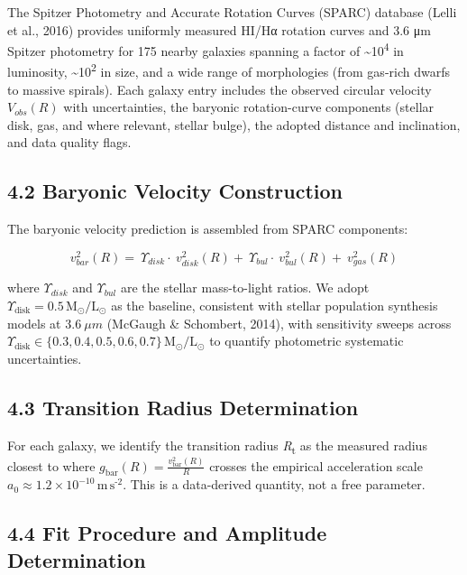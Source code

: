 The Spitzer Photometry and Accurate Rotation Curves (SPARC) database (Lelli et al., 2016) provides uniformly measured HI/Hα rotation curves and 3.6 μm Spitzer photometry for 175 nearby galaxies spanning a factor of \textasciitilde10\textsuperscript{4} in luminosity, \textasciitilde10\textsuperscript{2} in size, and a wide range of morphologies (from gas-rich dwarfs to massive spirals). Each galaxy entry includes the observed circular velocity \(V_{obs}(R)\) with uncertainties, the baryonic rotation-curve components (stellar disk, gas, and where relevant, stellar bulge), the adopted distance and inclination, and data quality flags.

\subsection{4.2 Baryonic Velocity Construction}\label{baryonic-velocity-construction}

The baryonic velocity prediction is assembled from SPARC components:

\[v_{bar}^{2}(R) = \ \Upsilon_{disk} \cdot \ v_{disk}^{2}(R) + \ \Upsilon_{bul} \cdot \ v_{bul}^{2}(R) + \ v_{gas}^{2}(R)\]

where \(\Upsilon_{disk}\) and \(\Upsilon_{bul}\) are the stellar mass-to-light ratios. We adopt \(\Upsilon_{\text{disk}} = 0.5\,\text{M}_{\text{⊙}}\text{/}\text{L}_{\text{⊙}}\) as the baseline, consistent with stellar population synthesis models at \(3.6\ \mu m\) (McGaugh \& Schombert, 2014), with sensitivity sweeps across \(\Upsilon_{\text{disk}} \in \text{\{}0.3,0.4,0.5,0.6,0.7\text{\}}\,\text{M}_{\text{⊙}}\text{/}\text{L}_{\text{⊙}}\) to quantify photometric systematic uncertainties.

\subsection{4.3 Transition Radius Determination}\label{transition-radius-determination}

For each galaxy, we identify the transition radius \emph{R}\textsubscript{t} as the measured radius closest to where \(g_{\text{bar}}(R) = \frac{v_{\text{bar}}^{2}(R)}{R}\) crosses the empirical acceleration scale \(a_{0} \approx 1.2 \times 10^{- 10}\,\text{m}\,\text{s}^{\text{-2}}\). This is a data-derived quantity, not a free parameter.

\subsection{4.4 Fit Procedure and Amplitude Determination}\label{fit-procedure-and-amplitude-determination}

